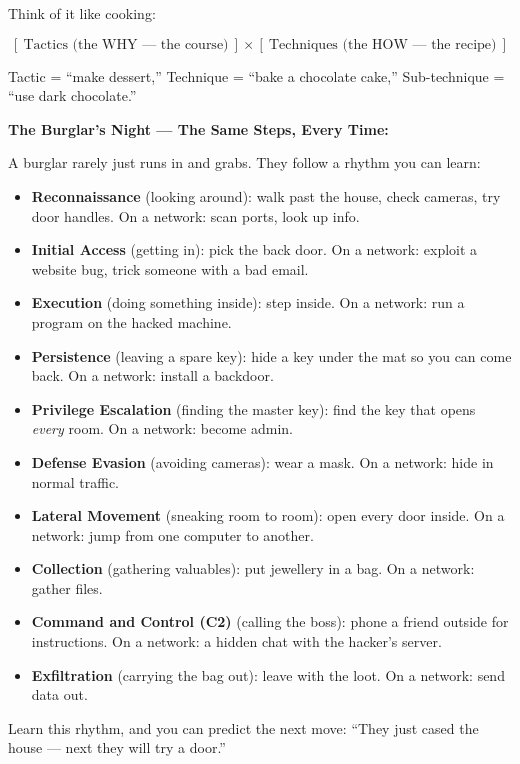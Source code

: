 \documentclass[11pt,a4paper]{article}
\begin{document}
Think of it like cooking:

\[
[\ \text{Tactics (the WHY --- the course)}\ ] \times
[\ \text{Techniques (the HOW --- the recipe)}\ ]
\]

Tactic = ``make dessert,'' Technique = ``bake a chocolate cake,'' Sub-technique
= ``use dark chocolate.''

\begin{storybox}
\textbf{The Burglar's Night --- The Same Steps, Every Time:}

A burglar rarely just runs in and grabs. They follow a rhythm you can learn:

\begin{itemize}[leftmargin=1.6em,itemsep=2pt]
  \item \textbf{Reconnaissance} (looking around): walk past the house, check
        cameras, try door handles. On a network: scan ports, look up info.
  \item \textbf{Initial Access} (getting in): pick the back door. On a network:
        exploit a website bug, trick someone with a bad email.
  \item \textbf{Execution} (doing something inside): step inside. On a network:
        run a program on the hacked machine.
  \item \textbf{Persistence} (leaving a spare key): hide a key under the mat so
        you can come back. On a network: install a backdoor.
  \item \textbf{Privilege Escalation} (finding the master key): find the key
        that opens \emph{every} room. On a network: become admin.
  \item \textbf{Defense Evasion} (avoiding cameras): wear a mask. On a network:
        hide in normal traffic.
  \item \textbf{Lateral Movement} (sneaking room to room): open every door
        inside. On a network: jump from one computer to another.
  \item \textbf{Collection} (gathering valuables): put jewellery in a bag.
        On a network: gather files.
  \item \textbf{Command and Control (C2)} (calling the boss): phone a friend
        outside for instructions. On a network: a hidden chat with the hacker's
        server.
  \item \textbf{Exfiltration} (carrying the bag out): leave with the loot.
        On a network: send data out.
\end{itemize}

Learn this rhythm, and you can predict the next move: ``They just cased the
house --- next they will try a door.''
\end{storybox}
\end{document}
